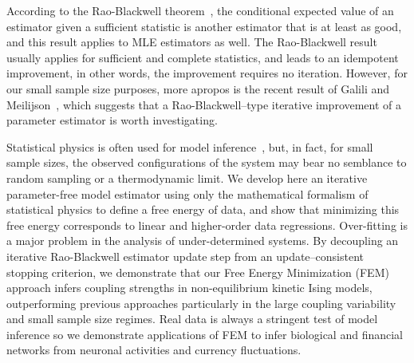 \documentclass[prx,twocolumn,twoside,showpacs,superscriptaddress]{revtex4-1}
\begin{document}
According to the Rao-Blackwell theorem~\cite{Rao1945, Blackwell1947}, %
the conditional expected value of an estimator given a sufficient statistic is another estimator that is at least as good, and this result applies to MLE estimators as well. The  Rao-Blackwell result usually applies for sufficient and complete statistics, and leads to an idempotent improvement, in other words, the improvement requires no iteration. However, for our small sample size purposes, more apropos is the recent result of Galili and Meilijson~\cite{Galili2016}, which suggests that a Rao-Blackwell--type iterative improvement of a parameter estimator is  worth investigating. 

Statistical physics is often used for model inference~\cite{Sohl-Dickstein2011, Decelle2014}, 
but, in fact, for small sample sizes, the observed configurations of the system may bear no semblance to random sampling or a  thermodynamic limit. We develop here an iterative parameter-free model estimator using only the mathematical formalism of statistical physics to define a free energy of data, and show that minimizing this free energy corresponds to linear and higher-order data regressions. 
Over-fitting is a major problem in the analysis of under-determined systems.
By decoupling an iterative Rao-Blackwell estimator update step from an update--consistent stopping criterion, we demonstrate that our Free Energy Minimization (FEM) approach infers coupling strengths in non-equilibrium kinetic Ising models, outperforming previous approaches particularly in the large coupling variability and small sample size regimes. Real data is always a stringent test of model inference so we demonstrate applications of FEM to infer biological and financial networks from neuronal activities and currency fluctuations. 
 
\end{document}
